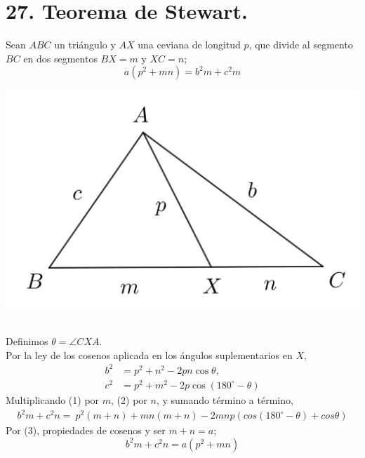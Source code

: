 \documentclass[12pt,a4paper, oneside]{book}
\begin{document}
\section{27. Teorema de Stewart.}
Sean $ABC$ un triángulo y $AX$ una ceviana de longitud $p$, que divide al segmento $BC$ en dos segmentos $BX=m$ y $XC=n$; $$a(p^2 +mn) = b^2m + c^2m$$
\begin{center}
\includegraphics[scale=0.6]{Imagenes/stewart.png} 
\end{center}
\\
Definimos $\theta=\angle CXA$.
\\Por la ley de los cosenos aplicada en los ángulos suplementarios en $X$,
\setcounter{equation}{0}
\begin{align}
b^2&= p^2 + n^2-2pn \cos \theta,\\
c^2&= p^2 + m^2-2p \cos (180^{\circ}-\theta)
\end{align}
Multiplicando (1) por $m$, (2) por $n$, y sumando término a término, 
\begin{eqnarray}
b^2m + c^2n=\ p^2(m+n)+mn(m+n)-2mnp(cos(180^{\circ}-\theta)+cos \theta )
\end{eqnarray}
Por (3), propiedades de cosenos y ser $m+n=a$;
$$b^2m + c^2n=a(p^2+mn)$$
\end{document}
